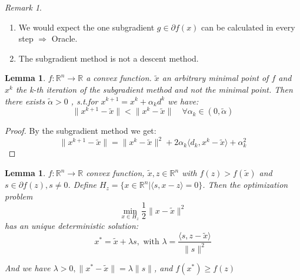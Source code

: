 \documentclass[a4paper,11pt,fleqn, draft]{book}
\newtheorem{lemma}[theorem]{Lemma}
\theoremstyle{definition}
\theoremstyle{remark}
\newtheorem*{remark}{Remark}
\begin{document}
\begin{remark}\quad
	\begin{enumerate}
		\item We would expect the one subgradient $g \in \partial f(x)$ can be calculated in every step $\Rightarrow$ Oracle.
		\item The subgradient method is not a descent method.
	\end{enumerate}
\end{remark}


\begin{lemma}
	$f : \mathbb{R}^n \longrightarrow \mathbb{R}$ a convex function. $\tilde{x}$ an arbitrary minimal point of $f$ and $x^k$ the k-th iteration of the subgradient method and not the minimal point. Then there exists $\tilde{\alpha} > 0$ , s.t.for $x^{k + 1} = x^{k} + \alpha_k d^k$ we have:
		\begin{equation*}
			\| x^{k + 1} - \tilde{x} \|  < \| x^k - \tilde{x} \| \quad \forall \alpha_k \in (0, \tilde{\alpha})
		\end{equation*}
\end{lemma}

\begin{proof}
	By the subgradient method we get:
	\begin{equation*}
		\| x^{k+1} - \tilde{x} \| = \| x^k - \tilde{x} \|^2 + 2 \alpha_k \langle d_k, x^k - \tilde{x} \rangle + \alpha_k^2
	\end{equation*}
\end{proof}

\begin{lemma}
	$f : \mathbb{R}^n \longrightarrow \mathbb{R}$ convex function, $\tilde{x}, z \in \mathbb{R}^n$ with $f(z) > f(\tilde{x})$ and $s \in \partial f(z), s \neq 0$. Define $H_z = \{ x \in \mathbb{R}^n | \langle s, x - z \rangle = 0\}$. 
	Then the optimization problem
		\begin{equation*}
			\min_{x \in H_z} \frac{1}{2} \| x - \tilde{x} \|^2
		\end{equation*}
		has an unique deterministic solution:
		\begin{equation*}
			x^* = \tilde{x} + \lambda s, \text{  with } \lambda = \frac{\langle s,  z - \tilde{x} \rangle}{\| s\|^2}
		\end{equation*}
		
		And we have $\lambda > 0, \|x^* - \tilde{x} \| = \lambda \|s\|$, and $f(x^*) \geq f(z)$
\end{lemma}
\end{document}
